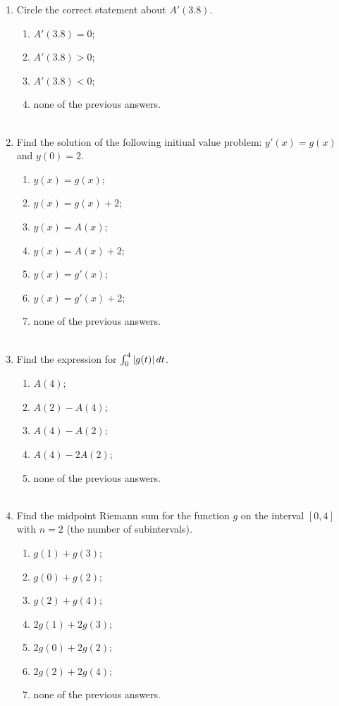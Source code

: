 \documentclass{ximera}
\begin{document}
\begin{problem}
\begin{enumerate}
    \item
      Circle the correct statement about $A'(3.8)$.
      \begin{enumerate}
        \item $A'(3.8) = 0$;
        \item $A'(3.8) > 0$;
        \item $A'(3.8) < 0$;
        \item none of the previous answers.\\ \\
      \end{enumerate}
      
    \item
      Find the solution of the following initiual value problem: $y'(x) = g(x)$ and $y(0) = 2$.
      \begin{enumerate}
        \item $y(x) = g(x)$;
        \item $y(x) = g(x) + 2$;
        \item $y(x) = A(x)$;
        \item $y(x) = A(x) + 2$;
        \item $y(x) = g'(x)$;
        \item $y(x) = g'(x) + 2$;
        \item none of the previous answers.\\ \\
      \end{enumerate}
      
    \item
      Find the expression for $\int_0^4 |g(t)| \,d t$.
      \begin{enumerate}
        \item $A(4)$;
        \item $A(2) - A(4)$;
        \item $A(4) - A(2)$;
        \item $A(4) - 2 A(2)$;
        \item none of the previous answers.\\ \\
      \end{enumerate}
      
    \item
      Find the midpoint Riemann sum for the function $g$ on the interval $[0, 4]$ with $n = 2$ (the number of subintervals).
      \begin{enumerate}
        \item $g(1) + g(3)$;
        \item $g(0) + g(2)$;
        \item $g(2) + g(4)$;
        \item $2g(1) + 2g(3)$;
        \item $2g(0) + 2g(2)$;
        \item $2g(2) + 2g(4)$;
        \item none of the previous answers.
      \end{enumerate}
      
\end{enumerate}

\end{problem}
\end{document}
